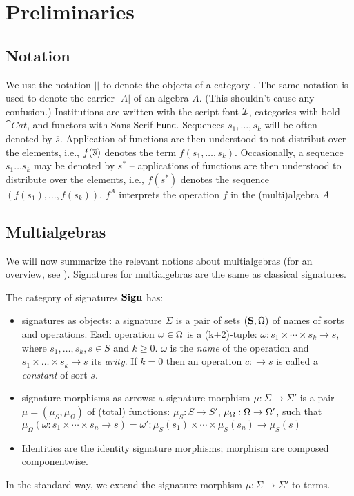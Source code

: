 \documentclass[10pt]{article}
\begin{document}
  
\section{Preliminaries}\label{se:pre}

\subsection{Notation}
We use the notation $|${}$|$ to denote the objects of a category
. The same notation is used to denote the carrier $|A|$ of an algebra
$A$. (This shouldn't cause any confusion.)  Institutions are written with
the script font ${\mathcal{I}}$, categories with bold $\cat{Cat}$, and functors with
Sans Serif ${\sf {Func}}$.  Sequences $s_1, \ldots, s_k$ will be often denoted
by $\overline{s}$. Application of functions are then understood to not
distribut over the elements, i.e., $f(\overline{s})$ denotes the term
$f(s_1,\ldots, s_k)$.  
Occasionally, a sequence $s_1 \ldots s_k$ may be denoted by $s^*$ -- 
applications of functions are then understood to
distribute over the elements, i.e., $f(s^*)$ denotes the sequence
$(f(s_1),\ldots, f(s_k))$. $f^A$ interprets the operation $f$ in the (multi)algebra $A$


\subsection{Multialgebras}
We will now summarize the relevant notions about multialgebras (for an
overview, see \cite{multi,catrel}). %
Signatures for multialgebras are the same as classical signatures.
%
\begin{definition}\label{de:Sign}
The category of signatures ${\bf Sign}$ has:
\begin{itemize}\MyLPar
\item signatures as objects: a signature
$\Sigma$ is a pair of sets $({\bf S},\Omega)$ of names of sorts and
operations. Each operation $\omega\in\Omega$ is a (k+2)-tuple:
$\omega : s_1 \times \cdots \times s_k \to s$,
where {$s_1, \ldots , s_k,s \in S$ and $k \geq 0$}.  $\omega$ is the
{\it name} of the operation and $s_1 \times \ldots \times s_k \to s$ its {\it
arity}. If $ k=0$ then an operation $c: \to s$ is called a {\it constant} of
sort $s$.
\item  signature morphisms as arrows: 
a signature morphism $\mu: \Sigma \to \Sigma'$ is a pair $\mu = (\mu_S,
\mu_{\Omega})$ of (total) functions:
$\mu_S: S \to S'$, $\mu_{\Omega}: \Omega \to \Omega'$, 
such that 
$ \mu_{\Omega}(\omega:s_1 \times \cdots \times s_n \to s) =
\omega':\mu_S(s_1) \times \cdots \times \mu_S(s_n) \to \mu_S(s)$
\item
Identities are the identity
signature morphisms; morphism are composed componentwise.
\end{itemize}
\end{definition}
%
In the standard way, 
we extend the signature morphism $\mu : \Sigma \to \Sigma'$ to terms.
\end{document}
